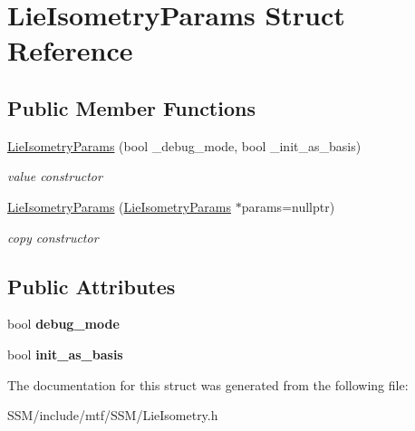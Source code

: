 \hypertarget{structLieIsometryParams}{\section{Lie\-Isometry\-Params Struct Reference}
\label{structLieIsometryParams}
}
\subsection*{Public Member Functions}
\begin{DoxyCompactItemize}
\item 
\hypertarget{structLieIsometryParams_a07f5b6928267def52468148f4eb981c3}{\hyperlink{structLieIsometryParams_a07f5b6928267def52468148f4eb981c3}{Lie\-Isometry\-Params} (bool \-\_\-debug\-\_\-mode, bool \-\_\-init\-\_\-as\-\_\-basis)}\label{structLieIsometryParams_a07f5b6928267def52468148f4eb981c3}

\begin{DoxyCompactList}\small\item\em value constructor \end{DoxyCompactList}\item 
\hypertarget{structLieIsometryParams_a283eb430f11384458003449dea75151f}{\hyperlink{structLieIsometryParams_a283eb430f11384458003449dea75151f}{Lie\-Isometry\-Params} (\hyperlink{structLieIsometryParams}{Lie\-Isometry\-Params} $\ast$params=nullptr)}\label{structLieIsometryParams_a283eb430f11384458003449dea75151f}

\begin{DoxyCompactList}\small\item\em copy constructor \end{DoxyCompactList}\end{DoxyCompactItemize}
\subsection*{Public Attributes}
\begin{DoxyCompactItemize}
\item 
\hypertarget{structLieIsometryParams_ad732bd595f8a322547d3656f9a7a3d62}{bool {\bfseries debug\-\_\-mode}}\label{structLieIsometryParams_ad732bd595f8a322547d3656f9a7a3d62}

\item 
\hypertarget{structLieIsometryParams_a0d985a745a70f84b77f5290b70bccdd1}{bool {\bfseries init\-\_\-as\-\_\-basis}}\label{structLieIsometryParams_a0d985a745a70f84b77f5290b70bccdd1}

\end{DoxyCompactItemize}


The documentation for this struct was generated from the following file\-:\begin{DoxyCompactItemize}
\item 
S\-S\-M/include/mtf/\-S\-S\-M/Lie\-Isometry.\-h\end{DoxyCompactItemize}
